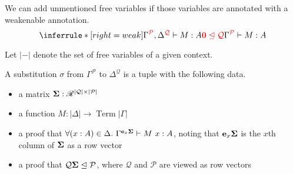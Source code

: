 \begin{lemma}[Weakening]
  We can add unmentioned free variables if those variables are annotated with a
  weakenable annotation.
  \[
    \inferrule*[right=weak]{
      \ctx{\Gamma}{\mathcal P}, \ctx{\Delta}{\mathcal Q} \vdash M : A
      \\ \rescomment{\vct 0 \subres \mathcal Q}
    }
    {
      \ctx{\Gamma}{\mathcal P} \vdash M : A
    }
  \]
\end{lemma}

Let $|-|$ denote the set of free variables of a given context.

\begin{definition}
  A substitution $\sigma$ from $\Gamma^{\mathcal P}$ to
  $\Delta^{\mathcal Q}$ is a tuple with the following data.

  \begin{itemize}
  \item a matrix $\mathbf{\Sigma} : \mathscr R^{|\mathcal Q| \times |\mathcal P|}$
  \item a function $M : |\Delta| \to \operatorname{Term} |\Gamma|$
  \item a proof that $\forall (x:A) \in \Delta.~\Gamma^{\mathbf{e}_x \mathbf{\Sigma}}
    \vdash M~x : A$, noting that $\mathbf{e}_x \mathbf{\Sigma}$ is the $x$th column of
    $\mathbf{\Sigma}$ as a row vector
  \item a proof that $\mathcal Q \mathbf{\Sigma} \trianglelefteq \mathcal P$, where
    $\mathcal Q$ and $\mathcal P$ are viewed as row vectors
  \end{itemize}
\end{definition}

